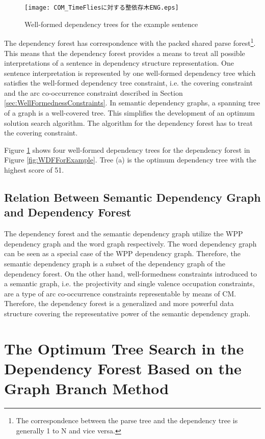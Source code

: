 \begin{figure}[b]
 \begin{center}
     \texttt{[image: COM\_TimeFliesに対する整依存木ENG.eps]}
 \end{center}
\myfiglabelskippre
\caption{Well-formed dependency trees for the example sentence}
\label{fig:WellFormedTreesForExample}
\end{figure}

The dependency forest has correspondence with the packed shared parse
forest\footnote{The correspondence between the parse tree and the
dependency tree is generally 1 to N and vice versa.}. This means that
the dependency forest provides a means to treat all possible
interpretations of a sentence in dependency structure representation.
One sentence interpretation is represented by one well-formed
dependency tree which satisfies the well-formed dependency tree
constraint, i.e. the covering constraint and the arc co-occurrence
constraint described in Section \ref{sec:WellFormednessConstraints}.
In semantic dependency graphs, a spanning tree of a graph is a
well-covered tree. This simplifies the development of an optimum
solution search algorithm. The algorithm for the dependency forest has
to treat the covering
constraint. 

Figure \ref{fig:WellFormedTreesForExample} shows four
well-formed dependency trees for the dependency forest in Figure
\ref{fig:WDFForExample}. Tree (a) is the optimum dependency tree with
the highest score of 51.


\subsection{Relation Between Semantic Dependency Graph and Dependency Forest}

The dependency forest and the semantic dependency graph utilize the
WPP dependency graph and the word graph respectively. The word
dependency graph can be seen as a special case of the WPP dependency
graph. Therefore, the semantic dependency graph is a subset of the
dependency graph of the dependency forest. On the other hand,
well-formedness constraints introduced to a semantic graph, i.e. the
projectivity and single valence occupation constraints, are a type of
arc co-occurrence constraints representable by means of CM. Therefore,
the dependency forest is a generalized and more powerful data
structure covering the representative power of the semantic dependency
graph.


\section{The Optimum Tree Search in the Dependency Forest Based on the Graph Branch Method}
\label{sec:OptimumTreeSearchForDependencyForest}

